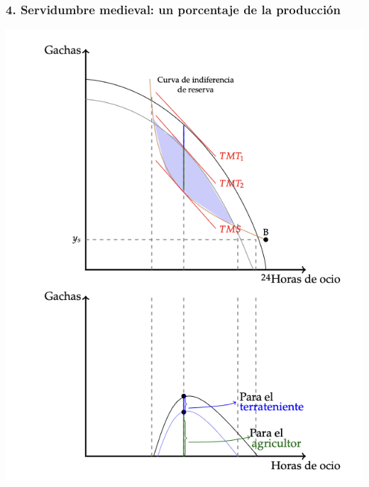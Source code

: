 \documentclass{beamer}
\begin{document}
\begin{frame}
\frametitle{4. Servidumbre medieval: un porcentaje de la producción}
\centering
\includegraphics[scale=0.6]{Slides Principios de Economia/gachas.png}
\end{frame}
\end{document}
